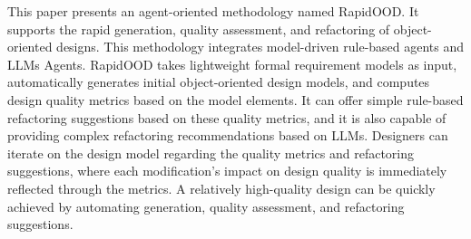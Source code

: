 \documentclass[pdflatex,sn-mathphys-num]{sn-jnl}%
\theoremstyle{thmstyleone}%
\theoremstyle{thmstyletwo}%
\theoremstyle{thmstylethree}%
\begin{document}
This paper presents an agent-oriented methodology named RapidOOD. 
It supports the rapid generation, quality assessment, and refactoring of object-oriented designs. 
This methodology integrates model-driven rule-based agents and LLMs Agents. 
RapidOOD takes lightweight formal requirement models\cite{LWFM1} as input, automatically generates initial object-oriented design models, and computes design quality metrics based on the model elements. 
It can offer simple rule-based refactoring suggestions based on these quality metrics, and it is also capable of providing complex refactoring recommendations based on LLMs. Designers can iterate on the design model regarding the quality metrics and refactoring suggestions, where each modification's impact on design quality is immediately reflected through the metrics. A relatively high-quality design can be quickly achieved by automating generation, quality assessment, and refactoring suggestions.
\end{document}
